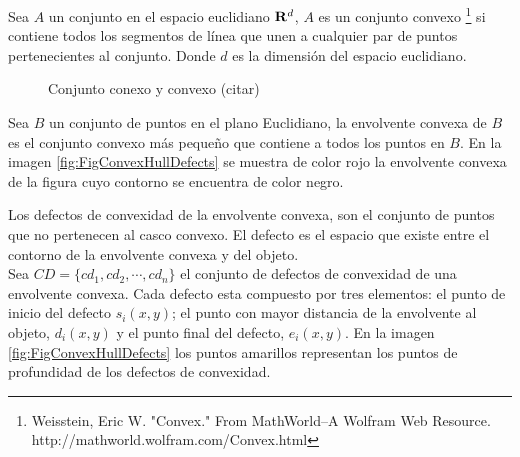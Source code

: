Sea $A$ un conjunto en el espacio euclidiano $\bold{R}^d$, $A$ es un conjunto convexo \footnote{Weisstein, Eric W. "Convex." From MathWorld--A Wolfram Web Resource. http://mathworld.wolfram.com/Convex.html} si contiene todos los segmentos de línea que unen a cualquier par de puntos pertenecientes al conjunto. Donde $d$ es la dimensión del espacio euclidiano. 
\begin{figure}[h!]
\centering
{} \hspace{10mm}
 \hspace{10mm}
\caption{Conjunto conexo y convexo (citar)}\label{fig:Sets}
\end{figure} 

Sea $B$ un conjunto de puntos en el plano Euclidiano, la envolvente convexa de $B$ es el conjunto convexo más pequeño que contiene a todos los puntos en $B$. En la imagen \ref{fig:FigConvexHullDefects} se muestra de color rojo la envolvente convexa de la figura cuyo contorno se encuentra de color negro. 

Los defectos de convexidad de la envolvente convexa, son el conjunto de puntos que no pertenecen al casco convexo. El defecto es el espacio que existe entre el contorno de la envolvente convexa y del objeto.\\
Sea $CD=\lbrace cd_1, cd_2, \cdots, cd_n \rbrace$ el conjunto de defectos de convexidad de una envolvente convexa. Cada defecto esta compuesto por tres elementos: el punto de inicio del defecto $s_i(x,y)$; el punto con mayor distancia de la envolvente al objeto, $d_i(x,y)$ y el punto final del defecto, $e_i(x,y)$.
En la imagen \ref{fig:FigConvexHullDefects} los puntos amarillos representan los puntos de profundidad de los defectos de convexidad. 

